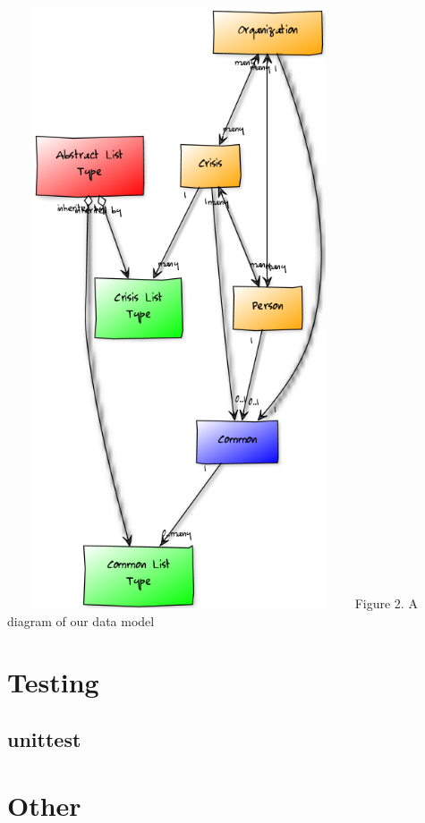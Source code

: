 \documentclass[12pt]{report}
\begin{document}
\newpage
\includegraphics*[width=4in,height=7in]{dataModelDiagram.png}
\newline
\footnotesize
Figure 2. A diagram of our data model %
\normalsize
\newpage

\newpage
\section*{Testing}
\subsection*{unittest}

\newpage
\section*{Other}
\end{document}
